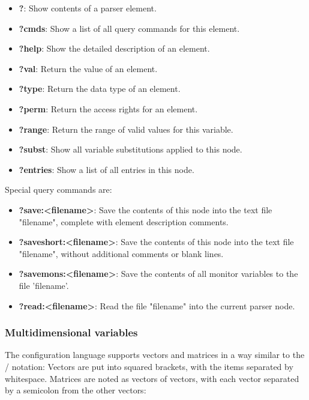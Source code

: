 \begin{itemize}
\item {\bf ?}: Show contents of a parser element.
\item {\bf ?cmds}: Show a list of all query commands for this element.
\item {\bf ?help}: Show the detailed description of an element.
\item {\bf ?val}: Return the value of an element.
\item {\bf ?type}: Return the data type of an element.
\item {\bf ?perm}: Return the access rights for an element.
\item {\bf ?range}: Return the range of valid values for this variable.
\item {\bf ?subst}: Show all variable substitutions applied to this node.
\item {\bf ?entries}: Show a list of all entries in this node.
\end{itemize}

Special query commands are:
%
%
%
%

\begin{itemize}
\item {\bf ?save:<filename>}: Save the contents of this node into the
text file "filename", complete with element description comments.
\item {\bf ?saveshort:<filename>}: Save the contents of this node into the
text file "filename", without additional comments or blank lines.
\item {\bf ?savemons:<filename>}: Save the contents of all monitor variables to
  the file 'filename'.
\item {\bf ?read:<filename>}: Read the file "filename" into the current
parser node.
\end{itemize}

\subsubsection{Multidimensional variables}%
%
%

The \mha{} configuration language supports vectors and matrices in a way similar
to the \Octave{} / \Matlab{} notation: Vectors are put into squared brackets, with
the items separated by whitespace. Matrices are
noted as vectors of vectors, with each vector separated by a semicolon
from the other vectors:

